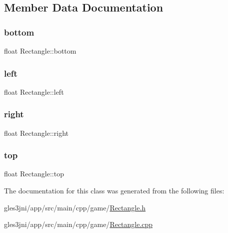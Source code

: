 \subsection{Member Data Documentation}
\mbox{\label{class_rectangle_a9b18ca2e2e8d9b333309d55c6e804b20}} 
\subsubsection{\texorpdfstring{bottom}{bottom}}
{\footnotesize\ttfamily float Rectangle\+::bottom}

\mbox{\label{class_rectangle_a5e59c0573284f368da58bb94af7effc2}} 
\subsubsection{\texorpdfstring{left}{left}}
{\footnotesize\ttfamily float Rectangle\+::left}

\mbox{\label{class_rectangle_a793506c993149cfefa11840014fb4039}} 
\subsubsection{\texorpdfstring{right}{right}}
{\footnotesize\ttfamily float Rectangle\+::right}

\mbox{\label{class_rectangle_a87a5fabfb34ee12b61f58f9fcd8a32d3}} 
\subsubsection{\texorpdfstring{top}{top}}
{\footnotesize\ttfamily float Rectangle\+::top}



The documentation for this class was generated from the following files\+:\begin{DoxyCompactItemize}
\item 
gles3jni/app/src/main/cpp/game/\hyperlink{_rectangle_8h}{Rectangle.\+h}\item 
gles3jni/app/src/main/cpp/game/\hyperlink{_rectangle_8cpp}{Rectangle.\+cpp}\end{DoxyCompactItemize}
